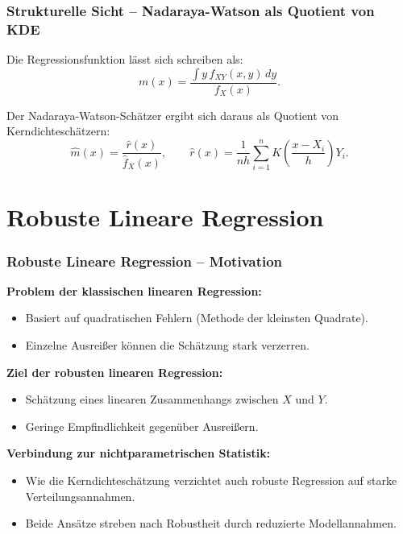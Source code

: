 \documentclass{beamer}
\newif\ifpauseswitch
\newif\ifshowskipbutton
\begin{document}
	
	\begin{frame}
		\frametitle{Strukturelle Sicht – Nadaraya-Watson als Quotient von KDE}
		
		Die Regressionsfunktion lässt sich schreiben als:
		\[
		m(x) = \frac{\int y\, f_{XY}(x,y)\, dy}{f_X(x)}.
		\]
		
		\vspace{0.5em}
		
		Der Nadaraya-Watson-Schätzer ergibt sich daraus als Quotient von Kerndichteschätzern:
		\[
		\hat m(x) = \frac{\hat r(x)}{\hat f_X(x)},
		\qquad
		\hat r(x) = \frac{1}{nh} \sum_{i=1}^n
		K\!\left(\frac{x-X_i}{h}\right) Y_i.
		\]
	\end{frame}
	
	
	\showskipbuttontrue
	\section{Robuste Lineare Regression}
	
	\begin{frame}
		\frametitle{Robuste Lineare Regression – Motivation}
		
		\textbf{Problem der klassischen linearen Regression:}
		\begin{itemize}
			\itemsep8pt
			\item Basiert auf quadratischen Fehlern (Methode der kleinsten Quadrate).
			\item Einzelne Ausreißer können die Schätzung stark verzerren.
		\end{itemize}
		
		\vspace{0.5em}
		
		\ifpauseswitch
		\pause
		\fi
		
		\textbf{Ziel der robusten linearen Regression:}
		\begin{itemize}
			\itemsep8pt
			\item Schätzung eines linearen Zusammenhangs zwischen $X$ und $Y$.
			\item Geringe Empfindlichkeit gegenüber Ausreißern.
		\end{itemize}
		
		\vspace{0.5em}
		
		\ifpauseswitch
		\pause
		\fi
		
		\textbf{Verbindung zur nichtparametrischen Statistik:}
		\begin{itemize}
			\itemsep8pt
			\item Wie die Kerndichteschätzung verzichtet auch robuste Regression auf starke Verteilungsannahmen.
			\item Beide Ansätze streben nach Robustheit durch reduzierte Modellannahmen.
		\end{itemize}
	\end{frame}
	
\end{document}

